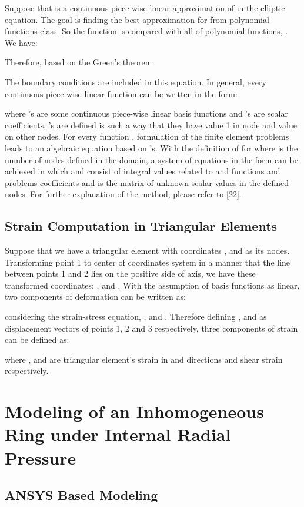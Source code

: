 \documentclass{jicspack}
\begin{document}
Suppose that  is a continuous piece-wise linear approximation of  in the elliptic equation. The goal is finding the best approximation for  from polynomial functions class. So the function  is compared with all of polynomial functions, . We have: 

Therefore, based on the Green's theorem:


The boundary conditions are included in this equation. In general, every continuous piece-wise linear function can be written in the form: 

where 's are some continuous piece-wise linear basis functions and 's
are scalar coefficients. 's are defined is such a way that they have value 1 in node  and value  on other nodes. For every function , formulation of the finite element problems leads to an algebraic equation based on 's. With the definition of  for  where  is the number of nodes defined in the domain, a system of equations in the form  can be achieved in which  and  consist of integral values related to  and  functions and problems coefficients and  is the matrix of unknown scalar values in the defined nodes. For further explanation of the method, please refer to [22]. 

\subsection{Strain Computation in Triangular Elements}
Suppose that we have a triangular element with coordinates ,  and  as its nodes. Transforming point 1 to center of coordinates system in a manner that the line between points 1 and 2 lies on the positive side of  axis, we have these transformed coordinates: ,  and . With the assumption of basis functions as linear, two components of deformation can be written as:
 
considering the strain-stress equation, ,  and  . Therefore defining ,  and   as displacement vectors of points 1, 2 and 3 respectively, three components of strain can be defined as: 

where ,  and   are triangular element's strain in  and  directions and shear strain respectively.

\section{Modeling of an Inhomogeneous Ring under Internal Radial Pressure}


\subsection{ANSYS Based Modeling }
\end{document}
